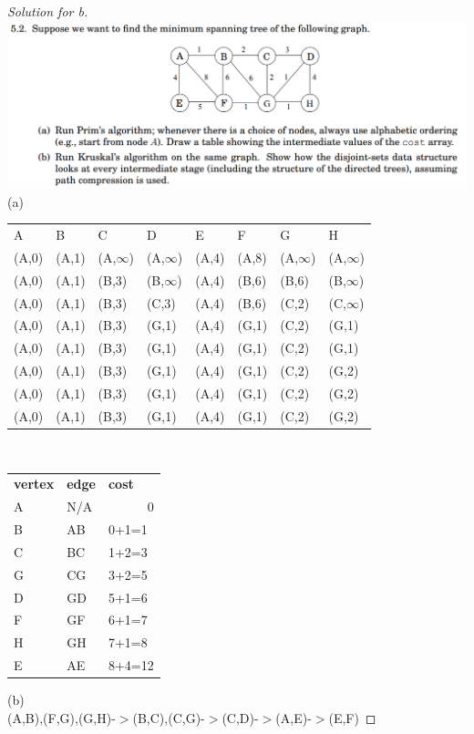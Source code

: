 \documentclass[12pt]{article}
\begin{document}
\begin{proof}[Solution for b]
	\ \\
	\includegraphics[scale=0.35]{3_2.png}\\
	(a)\\
    \begin{tabular}{llllllll}
	A    & B     & C   & D   & E    &F     & G     & H \\
	(A,0) & (A,1) & (A,$\infty$) & (A,$\infty$) & (A,4) & (A,8) & (A,$\infty$) & (A,$\infty$) \\
	(A,0) & (A,1) & (B,3) & (B,$\infty$) & (A,4) & (B,6) & (B,6) & (B,$\infty$) \\
	(A,0) & (A,1) & (B,3) & (C,3) & (A,4) & (B,6) & (C,2) & (C,$\infty$) \\
	(A,0) & (A,1) & (B,3) & (G,1) & (A,4) & (G,1) & (C,2) & (G,1) \\
	(A,0) & (A,1) & (B,3) & (G,1) & (A,4) & (G,1) & (C,2) & (G,1) \\
	(A,0) & (A,1) & (B,3) & (G,1) & (A,4) & (G,1) & (C,2) & (G,2) \\
	(A,0) & (A,1) & (B,3) & (G,1) & (A,4) & (G,1) & (C,2) & (G,2) \\
	(A,0) & (A,1) & (B,3) & (G,1) & (A,4) & (G,1) & (C,2) & (G,2) \\
\end{tabular}\\
    \begin{tabular}{lll}
	\textbf{vertex} & \textbf{edge}  & \textbf{cost} \\
	A     & N/A   & \multicolumn{1}{r}{0} \\
	B     & AB    & 0+1=1 \\
	C     & BC    & 1+2=3 \\
	G     & CG    & 3+2=5 \\
	D     & GD    & 5+1=6 \\
	F     & GF    & 6+1=7 \\
	H     & GH    & 7+1=8 \\
	E     & AE    & 8+4=12 \\
\end{tabular}%
(b)\\
(A,B),(F,G),(G,H)-$>$(B,C),(C,G)-$>$(C,D)-$>$(A,E)-$>$(E,F)
\end{proof}
\end{document}
